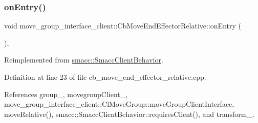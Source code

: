 \subsubsection{\texorpdfstring{on\+Entry()}{onEntry()}}
{\footnotesize\ttfamily void move\+\_\+group\+\_\+interface\+\_\+client\+::\+Cb\+Move\+End\+Effector\+Relative\+::on\+Entry (\begin{DoxyParamCaption}{ }\end{DoxyParamCaption})\hspace{0.3cm}{\ttfamily [override]}, {\ttfamily [virtual]}}



Reimplemented from \hyperlink{classsmacc_1_1SmaccClientBehavior_a7962382f93987c720ad432fef55b123f}{smacc\+::\+Smacc\+Client\+Behavior}.



Definition at line 23 of file cb\+\_\+move\+\_\+end\+\_\+effector\+\_\+relative.\+cpp.



References group\+\_\+, movegroup\+Client\+\_\+, move\+\_\+group\+\_\+interface\+\_\+client\+::\+Cl\+Move\+Group\+::move\+Group\+Client\+Interface, move\+Relative(), smacc\+::\+Smacc\+Client\+Behavior\+::requires\+Client(), and transform\+\_\+.


